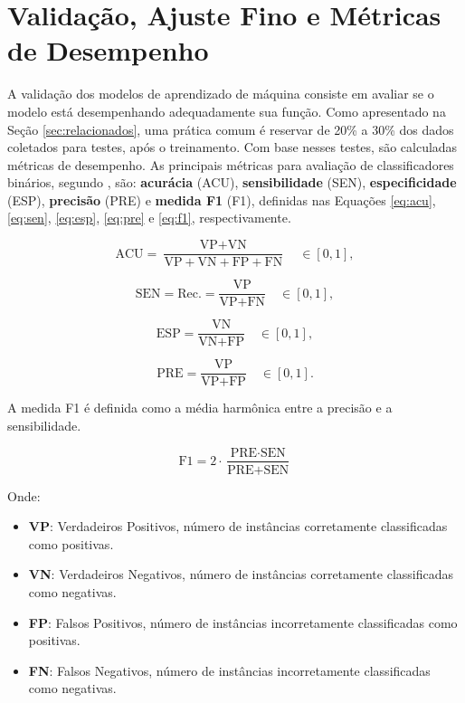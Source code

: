 \documentclass[repeatfields,xlists,xpacks,oneside]{ufrgscca}
\begin{document}
\section{Validação, Ajuste Fino e Métricas de Desempenho}
\label{sec:validacao}
A validação dos modelos de aprendizado de máquina consiste em avaliar se o modelo está desempenhando adequadamente sua função. Como apresentado na Seção \ref{sec:relacionados}, uma prática comum é reservar de 20\% a 30\% dos dados coletados para testes, após o treinamento. Com base nesses testes, são calculadas métricas de desempenho. As principais métricas para avaliação de classificadores binários, segundo \cite{Rainio2024}, são: \textbf{acurácia} (ACU), \textbf{sensibilidade} (SEN), \textbf{especificidade} (ESP), \textbf{precisão} (PRE) e \textbf{medida F1} (F1), definidas nas Equações \ref{eq:acu}, \ref{eq:sen}, \ref{eq:esp}, \ref{eq:pre} e \ref{eq:f1}, respectivamente.

\begin{equation}
\text{ACU} = \frac{\text{VP} + \text{VN}}{\text{VP} + \text{VN} + \text{FP} + \text{FN}} \quad \in [0, 1],
\label{eq:acu}
\end{equation}

\begin{equation}
\text{SEN} = \text{Rec.} = \frac{\text{VP}}{\text{VP} + \text{FN}} \quad \in [0, 1],
\label{eq:sen}
\end{equation}

\begin{equation}
\text{ESP} = \frac{\text{VN}}{\text{VN} + \text{FP}} \quad \in [0, 1],
\label{eq:esp}
\end{equation}

\begin{equation}
\text{PRE} = \frac{\text{VP}}{\text{VP} + \text{FP}} \quad \in [0, 1].
\label{eq:pre}
\end{equation}

A medida F1 é definida como a média harmônica entre a precisão e a sensibilidade.

\begin{equation}
\text{F1} = 2 \cdot \frac{\text{PRE} \cdot \text{SEN}}{\text{PRE} + \text{SEN}}
\label{eq:f1}
\end{equation}

Onde:
\begin{itemize}
    \item \textbf{VP}: Verdadeiros Positivos, número de instâncias corretamente classificadas como positivas.
    \item \textbf{VN}: Verdadeiros Negativos, número de instâncias corretamente classificadas como negativas.
    \item \textbf{FP}: Falsos Positivos, número de instâncias incorretamente classificadas como positivas.
    \item \textbf{FN}: Falsos Negativos, número de instâncias incorretamente classificadas como negativas.
\end{itemize}
\end{document}
